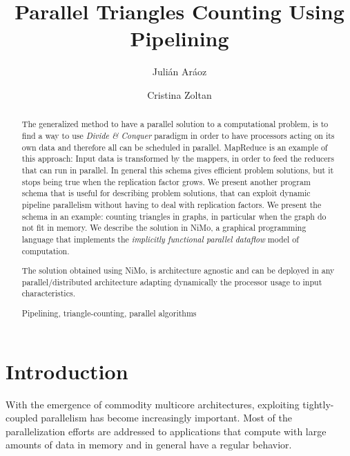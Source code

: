 \documentclass{article}                     \usepackage{graphics}
\begin{document}
\title{Parallel Triangles Counting Using Pipelining}





\author[1]{Juli\'an Ar\'aoz}     \author[2]{Cristina Zoltan}    




\maketitle
\setcounter{tocdepth}{3}
\begin{abstract}
The generalized method to have a parallel solution to a computational problem, is to find a way to use \textit{Divide \& Conquer} paradigm in order to have processors acting on its own data and therefore all can be scheduled in parallel.  MapReduce is an example of this approach: Input data is transformed by the mappers, in order to feed  the reducers that can run in parallel.  In general this schema gives efficient problem solutions, but it stops being true when the replication factor grows. We present another program schema that is useful for describing problem solutions, that can exploit dynamic pipeline parallelism without having to deal with replication factors. We  present the schema in an example: counting triangles in graphs, in particular when the graph do not fit in memory. We describe the solution in NiMo, a graphical programming language that implements the \textit{implicitly functional parallel dataflow} model of computation.

The solution obtained using NiMo, is architecture agnostic and can be deployed in any parallel/distributed architecture adapting dynamically the processor usage to input characteristics.
\vspace{5 mm}

Pipelining, triangle-counting, parallel algorithms \end{abstract}

\section{Introduction}


With the emergence of commodity multicore architectures, exploiting
tightly-coupled parallelism has become increasingly important. Most of the parallelization efforts are addressed to applications that compute with large amounts of data in memory and in general have a regular behavior. 
\end{document}
